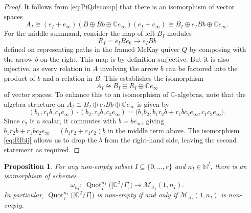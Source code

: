 \documentclass[10pt,a4paper]{amsart}
\newtheorem{Proposition}[Theorem]{Proposition}
 { \theoremstyle{definition}
\newtheorem{Definition}[Theorem]{Definition}
\newtheorem{Example}[Theorem]{Example}
\newtheorem{Remark}[Theorem]{Remark}
\newtheorem{remarks}[theorem]{Remarks}
}
\newcommand{\SC}{\mathbb{C}} %
\newcommand{\PiGamma}{B}
\newcommand{\PiQ}{A}
\DeclareMathOperator{\Quot}{\mathrm{Quot}}
\newcommand{\QuotI}[1][ ]{\Quot_I^{#1}}
\newcommand{\QuotInI}{\QuotI[n_I]}
\numberwithin{equation}{section}
\begin{document}
\begin{proof}
It follows from \eqref{eq:PiQdecomp} that there is an isomorphism of vector spaces
\begin{equation*} \PiQ_I
\cong (e_I+e_\infty) (\PiGamma \oplus \PiGamma b \oplus \SC e_\infty) (e_I+e_\infty) \cong \PiGamma_I \oplus e_I \PiGamma b \oplus \SC e_\infty.\end{equation*}
For the middle summand, consider the map of left $\PiGamma_I$-modules \begin{equation}
\label{eq:RIbij}
R_I = e_I\PiGamma e_0 \longrightarrow e_I\PiGamma b\end{equation} defined on representing paths in the framed McKay quiver $Q$ by composing with the arrow $b$ on the right. This map is by definition surjective. But it is also injective, as every relation in $\PiQ$ involving the arrow $b$ can be factored into the product of $b$ and a relation in $\PiGamma$. This establishes the isomorphism
\begin{equation*}
\PiQ_I \cong \PiGamma_I \oplus R_I \oplus \SC e_\infty
\end{equation*}
of vector spaces. To enhance this to an isomorphism of $\mathbb{C}$-algebras,
note that the algebra structure on $\PiQ_I \cong \PiGamma_I \oplus e_I \PiGamma b \oplus \SC e_\infty$ is given by
\[ (b_1,r_1b,c_1e_\infty) \cdot (b_2,r_2b,c_2e_\infty) = \big(b_1b_2,b_1r_2b+r_1bc_2e_\infty,c_1c_2e_\infty\big).\]
Since $c_2$ is a scalar, it commutes with $b=be_\infty$, giving $b_1r_2b+r_1bc_2e_\infty = (b_1r_2+r_1c_2)b$ in the middle term above. The isomorphism \eqref{eq:RIbij} allows us to drop the $b$ from the right-hand side, leaving the second statement as required.
\end{proof}

\begin{Proposition}
\label{prop:omegaiso}
For any non-empty subset $I\subseteq\{0,\dots,r\}$ and $n_I \in \mathbb{N}^{I}$, there is an isomorphism of schemes
\[\omega_{n_I} \colon \ \QuotInI\big(\big[\SC^2/\Gamma\big]\big) \longrightarrow \mathcal{M}_{\PiQ_I}(1,n_I).\]
In particular, $\QuotInI\big(\big[\SC^2/\Gamma\big]\big)$ is non-empty if and only if $\mathcal{M}_{\PiQ_I}(1,n_I)$ is non-empty.
\end{Proposition}
\end{document}
